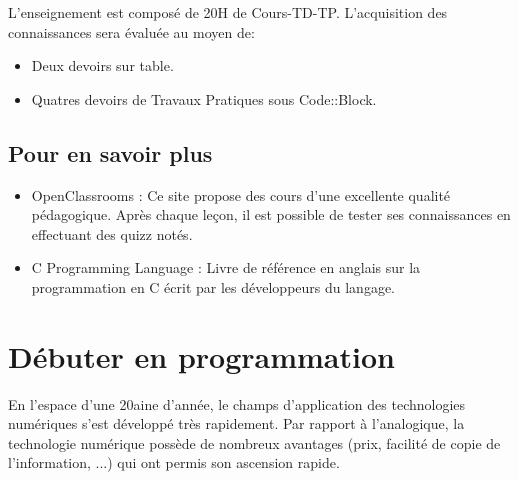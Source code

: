 \documentclass[a4paper,11pt]{book}
\theoremstyle{definition}
\begin{document}
L'enseignement est composé de 20H de Cours-TD-TP. L'acquisition des connaissances sera évaluée au moyen de:
\begin{itemize}
\item Deux devoirs sur table.
\item Quatres devoirs de Travaux Pratiques sous Code::Block.
\end{itemize}

\section*{Pour en savoir plus}

\begin{itemize}
\item OpenClassrooms \cite{ZER}: Ce site propose des cours d'une excellente
qualité pédagogique. Après chaque leçon, il est possible de
tester ses connaissances en effectuant des quizz notés.
\item C Programming Language \cite{KERN88}: Livre de référence en anglais sur la programmation en C écrit par les développeurs du langage.
\end{itemize}

\chapter{Débuter en programmation}

En l'espace d'une 20aine d'année, le champs d'application des technologies numériques s'est développé très rapidement. Par rapport à l'analogique, la technologie numérique possède de
nombreux avantages (prix, facilité de copie de l'information, ...) qui ont permis son ascension rapide. 
\end{document}

